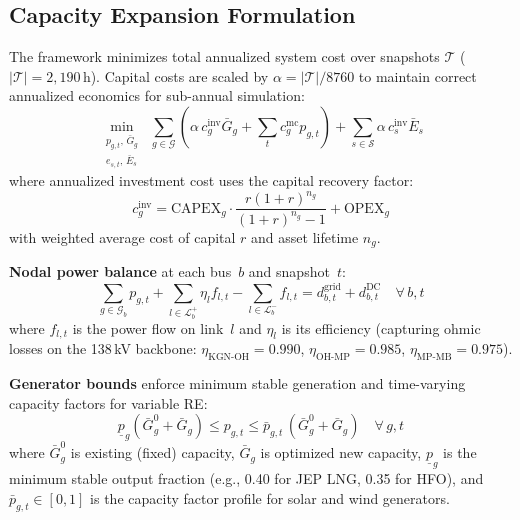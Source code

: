 \documentclass[conference,10pt]{IEEEtran}
\begin{document}
\subsection{Capacity Expansion Formulation}

The framework minimizes total annualized system cost over snapshots $\mathcal{T}$ ($|\mathcal{T}| = 2{,}190$\,h). Capital costs are scaled by $\alpha = |\mathcal{T}|/8760$ to maintain correct annualized economics for sub-annual simulation:
\begin{equation}
\min_{\substack{p_{g,t},\, \bar{G}_g \\ e_{s,t},\, \bar{E}_s}} \;\sum_{g \in \mathcal{G}} \left(\alpha\, c_g^{\text{inv}} \bar{G}_g + \sum_{t} c_g^{\text{mc}} p_{g,t}\right) + \sum_{s \in \mathcal{S}} \alpha\, c_s^{\text{inv}} \bar{E}_s
\label{eq:obj}
\end{equation}
where annualized investment cost uses the capital recovery factor:
\begin{equation}
c_g^{\text{inv}} = \text{CAPEX}_g \cdot \frac{r(1+r)^{n_g}}{(1+r)^{n_g}-1} + \text{OPEX}_g
\label{eq:crf}
\end{equation}
with weighted average cost of capital $r$ and asset lifetime $n_g$.

\noindent\textbf{Nodal power balance} at each bus~$b$ and snapshot~$t$:
\begin{equation}
\sum_{g \in \mathcal{G}_b} p_{g,t} + \sum_{l \in \mathcal{L}_b^{+}} \eta_l f_{l,t} - \sum_{l \in \mathcal{L}_b^{-}} f_{l,t} = d_{b,t}^{\text{grid}} + d_{b,t}^{\text{DC}} \quad \forall\, b,t
\label{eq:balance}
\end{equation}
where $f_{l,t}$ is the power flow on link~$l$ and $\eta_l$ is its efficiency (capturing ohmic losses on the 138\,kV backbone: $\eta_{\text{KGN-OH}}=0.990$, $\eta_{\text{OH-MP}}=0.985$, $\eta_{\text{MP-MB}}=0.975$).

\noindent\textbf{Generator bounds} enforce minimum stable generation and time-varying capacity factors for variable RE:
\begin{equation}
\underline{p}_g (\bar{G}_g^{0} + \bar{G}_g) \leq p_{g,t} \leq \bar{p}_{g,t}\, (\bar{G}_g^{0} + \bar{G}_g) \quad \forall\, g,t
\label{eq:gen}
\end{equation}
where $\bar{G}_g^{0}$ is existing (fixed) capacity, $\bar{G}_g$ is optimized new capacity, $\underline{p}_g$ is the minimum stable output fraction (e.g., 0.40 for JEP LNG, 0.35 for HFO), and $\bar{p}_{g,t} \in [0,1]$ is the capacity factor profile for solar and wind generators.
\end{document}

